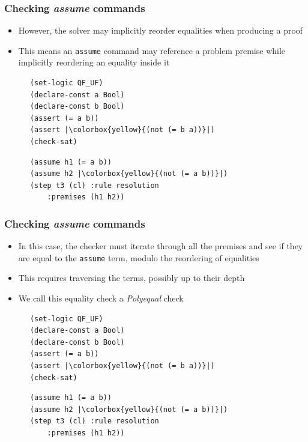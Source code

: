 \documentclass[usepdftitle=false,aspectratio=169]{beamer}
\newcommand\vitem{\vfill\item}
\begin{document}
\begin{frame}[fragile]
  \frametitle{Checking \textit{assume} commands}
  \begin{minipage}[c][0.45 \textheight]{0.55 \textwidth}
    \begin{itemize}
      \item However, the solver may implicitly reorder equalities when producing
      a proof
      \vitem This means an \texttt{assume} command may reference a problem premise
      while implicitly reordering an equality inside it
    \end{itemize}
  \end{minipage}
  \hfill
  \begin{minipage}{0.4 \textwidth}
    \begin{verbatim}
      (set-logic QF_UF)
      (declare-const a Bool)
      (declare-const b Bool)
      (assert (= a b))
      (assert |\colorbox{yellow}{(not (= b a))}|)
      (check-sat)
    \end{verbatim}
    \begin{verbatim}
      (assume h1 (= a b))
      (assume h2 |\colorbox{yellow}{(not (= a b))}|)
      (step t3 (cl) :rule resolution
          :premises (h1 h2))
    \end{verbatim}
  \end{minipage}
\end{frame}

\begin{frame}[fragile]
  \frametitle{Checking \textit{assume} commands}
  \begin{minipage}[c][0.55 \textheight]{0.55 \textwidth}
    \begin{itemize}
      \item In this case, the checker must iterate through all the premises and
      see if they are equal to the \texttt{assume} term, modulo the reordering
      of equalities
      \vitem This requires traversing the terms, possibly up to their depth
      \vitem We call this equality check a \textit{Polyequal} check
    \end{itemize}
  \end{minipage}
  \hfill
  \begin{minipage}{0.4 \textwidth}
    \begin{verbatim}
      (set-logic QF_UF)
      (declare-const a Bool)
      (declare-const b Bool)
      (assert (= a b))
      (assert |\colorbox{yellow}{(not (= b a))}|)
      (check-sat)
    \end{verbatim}
    \begin{verbatim}
      (assume h1 (= a b))
      (assume h2 |\colorbox{yellow}{(not (= a b))}|)
      (step t3 (cl) :rule resolution
          :premises (h1 h2))
    \end{verbatim}
  \end{minipage}
\end{frame}
\end{document}
